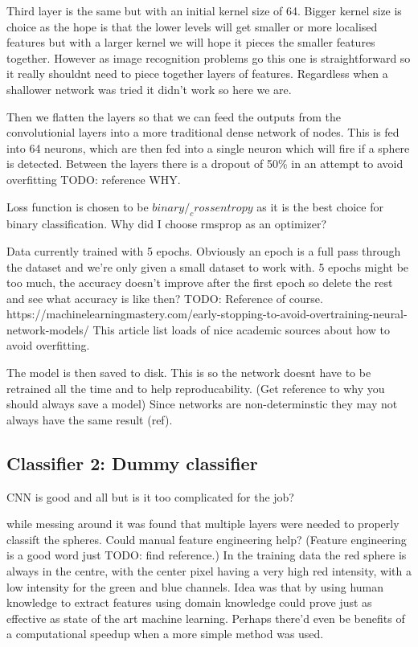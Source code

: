 \documentclass{article}
\begin{document}
Third layer is the same but with an initial kernel size of 64.
Bigger kernel size is choice as the hope is that the lower levels will get smaller or more localised features but with a larger kernel we will hope it pieces the smaller features together.
However as image recognition problems go this one is straightforward so it really shouldnt need to piece together layers of features.
Regardless when a shallower network was tried it didn't work so here we are.  


Then we flatten the layers so that we can feed the outputs from the convolutionial layers into a more traditional dense network of nodes.
This is fed into 64 neurons, which are then fed into a single neuron which will fire if a sphere is detected.
Between the layers there is a dropout of 50\% in an attempt to avoid overfitting TODO: reference WHY.

Loss function is chosen to be $binary/_crossentropy$ as it is the best choice for binary classification.
Why did I choose rmsprop as an optimizer? 

Data currently trained with 5 epochs.
Obviously an epoch is a full pass through the dataset and we're only given a small dataset to work with.
5 epochs might be too much, the accuracy doesn't improve after the first epoch so delete the rest and see what accuracy is like then?
TODO: Reference of course.
https://machinelearningmastery.com/early-stopping-to-avoid-overtraining-neural-network-models/
This article list loads of nice academic sources about how to avoid overfitting.

The model is then saved to disk.
This is so the network doesnt have to be retrained all the time and to help reproducability.
(Get reference to why you should always save a model)
Since networks are non-determinstic they may not always have the same result (ref).

\subsection{Classifier 2: Dummy classifier}
CNN is good and all but is it too complicated for the job?

while messing around it was found that multiple layers were needed to properly classift the spheres.
Could manual feature engineering help? (Feature engineering is a good word just TODO: find reference.)
In the training data the red sphere is always in the centre, with the center pixel having a very high red intensity, with a low intensity for the green and blue channels. 
Idea was that by using human knowledge to extract features using domain knowledge could prove just as effective as state of the art machine learning.
Perhaps there'd even be benefits of a computational speedup when a more simple method was used.
\end{document}
